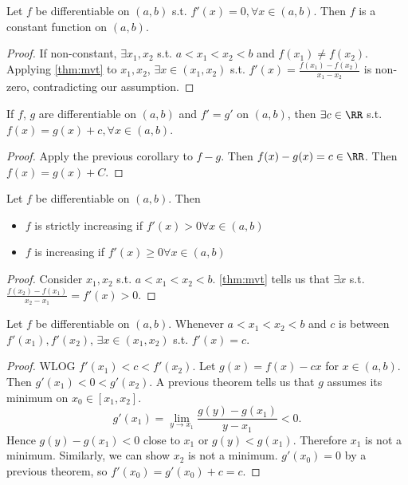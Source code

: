 \documentclass[11pt]{scrartcl}
\numberwithin{equation}{section}
\begin{document}
\begin{corollary}
    Let $f$ be differentiable on $(a,b)$ s.t. $f'(x) = 0, \forall x \in(a,b)$. Then $f$ is a constant function on $(a,b)$. 
\end{corollary}
\begin{proof}
    If non-constant, $\exists x_1,x_2$ s.t. $a<x_1<x_2<b$ and 
    $f(x_1)\neq f(x_2)$. Applying \cref{thm:mvt} to $x_1,x_2$,
    $\exists x\in (x_1,x_2)$ s.t. $f'(x) = \frac{f(x_1)-f(x_2)}{x_1-x_2}$ 
    is non-zero, contradicting our assumption.
\end{proof}
\begin{corollary}
    If $f$, $g$ are differentiable on $(a,b)$ and $f'=g'$ on 
    $(a,b)$, then $\exists c\in\RR$ s.t. $f(x)=g(x) + c, \forall x\in(a,b)$.
\end{corollary}
\begin{proof}
    Apply the previous corollary to $f-g$. Then $f(x)-g(x) = c\in\RR$.
    Then $f(x) = g(x)+C$.
\end{proof}

\begin{corollary}
    Let $f$ be differentiable on $(a,b)$. Then 
    \begin{itemize}
        \item $f$ is strictly increasing if $f'(x)>0 \forall x \in (a,b)$
        \item $f$ is increasing if $f'(x)\geq 0 \forall x \in (a,b)$
    \end{itemize}    
\end{corollary}

\begin{proof}
    Consider $x_1,x_2$ s.t. $a<x_1<x_2<b$. \cref{thm:mvt} tells us 
    that $\exists x$ s.t. $\frac{f(x_2)-f(x_1)}{x_2-x_1} = f'(x) > 0$.
\end{proof}

\begin{theorem}
    \label{thm:ivtderivatives}
    Let $f$ be differentiable on $(a,b)$. Whenever $a<x_1<x_2<b$ and 
    $c$ is between $f'(x_1), f'(x_2)$, $\exists x\in(x_1,x_2)$ s.t.
    $f'(x)=c$.
\end{theorem}

\begin{proof}
    WLOG $f'(x_1)<c<f'(x_2)$. Let $g(x) = f(x)-cx$ for $x\in (a,b)$.
    Then $g'(x_1)<0<g'(x_2)$. A previous theorem tells us that $g$ 
    assumes its minimum on $x_0\in[x_1,x_2]$.
    \[
        g'(x_1) = \lim_{y\rightarrow x_1}\frac{g(y)-g(x_1)}{y-x_1}<0.
    \]
    Hence $g(y)-g(x_1)<0$ close to $x_1$ or $g(y)<g(x_1)$.
    Therefore $x_1$ is not a minimum. Similarly, we can show $x_2$ is 
    not a minimum. $g'(x_0)=0$ by a previous theorem, 
    so $f'(x_0) = g'(x_0) + c = c$.
\end{proof}
\clearpage
\end{document}
